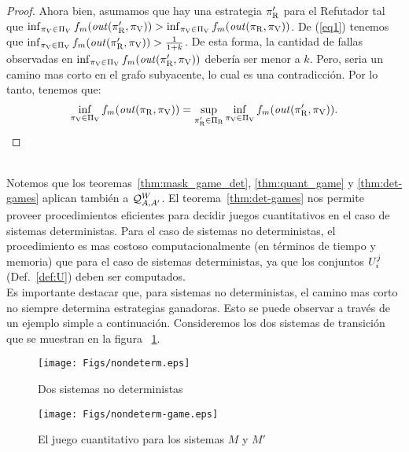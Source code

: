 \begin{proof}
Ahora bien, asumamos que hay una estrategia $\pi_{\mathrm{R}}'$ para el Refutador tal que 
$\inf_{\pi_V \in \Pi_V} f_m (\mathit{out}(\pi_{\mathrm{R}}', \pi_{\mathrm{V}})) > \inf_{\pi_{\mathrm{V}} \in \Pi_{\mathrm{V}}} f_m (\mathit{out}(\pi_{\mathrm{R}}, \pi_{\mathrm{V}}))$.
De (\ref{eq1}) tenemos que $\inf_{\pi_{\mathrm{V}} \in \Pi_{\mathrm{V}}} f_m(\mathit{out}(\pi_{\mathrm{R}}', \pi_{\mathrm{V}})) > \frac{1}{1+k}$. 
De esta forma, la cantidad de fallas observadas en 
$\inf_{\pi_{\mathrm{V}} \in \Pi_{\mathrm{V}}} f_m(\mathit{out}(\pi_{\mathrm{R}}', \pi_{\mathrm{V}}))$ debería ser menor a $k$. 
Pero, seria un camino mas corto en el grafo subyacente, lo cual es una contradicción. Por lo tanto, tenemos que:
\[	
	\inf_{\pi_{\mathrm{V}} \in \Pi_{\mathrm{V}}} f_m(\mathit{out}(\pi_{\mathrm{R}}, \pi_{\mathrm{V}})) = \sup_{\pi_{\mathrm{R}}' \in \Pi_{\mathrm{R}}} \inf_{\pi_{\mathrm{V}} \in \Pi_{\mathrm{V}}} f_m( \mathit{out}(\pi_{\mathrm{R}}',\pi_{\mathrm{V}})).
\]	
\qedhere
\end{proof} \\

	Notemos que los teoremas~\ref{thm:mask_game_det}, \ref{thm:quant_game} y \ref{thm:det-games} aplican también a 
$\mathcal{Q}^W_{A,A'}$.
	El teorema~\ref{thm:det-games} nos permite proveer procedimientos eficientes para decidir juegos cuantitativos en el caso de sistemas deterministas. Para el caso de sistemas no deterministas, el procedimiento es mas costoso computacionalmente (en términos de tiempo y memoria) que para el caso de sistemas deterministas, ya que los conjuntos $U^j_i$ (Def.~\ref{def:U}) deben ser computados. \\

Es importante destacar que, para sistemas no deterministas, el camino mas corto no siempre determina estrategias ganadoras. Esto se puede observar a través de un ejemplo simple a continuación. Consideremos los dos sistemas de transición que se muestran en la figura ~\ref{fig:two-nondet-systems}.

\begin{figure} [h]
\begin{center}
    \texttt{[image: Figs/nondeterm.eps]} 
    \caption{Dos sistemas no deterministas}
    \label{figure:nondeterm}\label{fig:two-nondet-systems}
\end{center}
\end{figure}
\begin{figure} [h]
\begin{center}
    \texttt{[image: Figs/nondeterm-game.eps]} 
    \caption{El juego cuantitativo para los sistemas $M$ y $M'$}
    \label{figure:nondeterm-game}
\end{center}
\end{figure}

